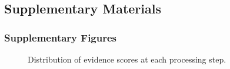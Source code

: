 \documentclass[
]{article}
\begin{document}
\hfill\break

\newpage{}

\subsection{Supplementary Materials}\label{supplementary-materials}

\subsubsection{Supplementary Figures}\label{supplementary-figures}

\label{cell-fig-evidence-histograms}
\begin{figure}[H]


\caption{\label{fig-evidence-histograms}Distribution of evidence scores
at each processing step.}

\end{figure}%
\end{document}
